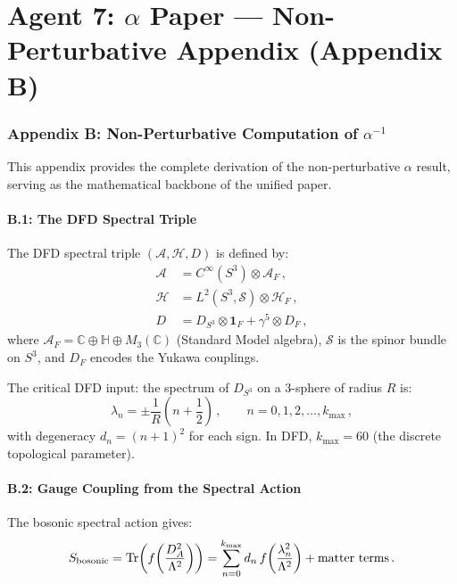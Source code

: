 \documentclass[11pt,a4paper]{article}
\newcommand{\Tr}{\operatorname{Tr}}
\begin{document}
\part{Agent 7: $\alpha$ Paper --- Non-Perturbative Appendix (Appendix B)}
\label{part:alpha-appendix}

\section{Appendix B: Non-Perturbative Computation of $\alpha^{-1}$}

This appendix provides the complete derivation of the non-perturbative $\alpha$ result, serving as the mathematical backbone of the unified paper.

\subsection{B.1: The DFD Spectral Triple}

The DFD spectral triple $(\mathcal{A}, \mathcal{H}, D)$ is defined by:
\begin{align}
\mathcal{A} &= C^\infty(S^3) \otimes \mathcal{A}_F\,, \\
\mathcal{H} &= L^2(S^3, \mathcal{S}) \otimes \mathcal{H}_F\,, \\
D &= D_{S^3} \otimes \mathbf{1}_F + \gamma^5 \otimes D_F\,,
\end{align}
where $\mathcal{A}_F = \mathbb{C} \oplus \mathbb{H} \oplus M_3(\mathbb{C})$ (Standard Model algebra), $\mathcal{S}$ is the spinor bundle on $S^3$, and $D_F$ encodes the Yukawa couplings.

The critical DFD input: the spectrum of $D_{S^3}$ on a 3-sphere of radius $R$ is:
\begin{equation}
\lambda_n = \pm\frac{1}{R}\left(n + \frac{1}{2}\right)\,, \qquad n = 0, 1, 2, \ldots, k_{\max}\,,
\end{equation}
with degeneracy $d_n = (n+1)^2$ for each sign. In DFD, $k_{\max} = 60$ (the discrete topological parameter).

\subsection{B.2: Gauge Coupling from the Spectral Action}

The bosonic spectral action gives:
\begin{equation}
S_{\rm bosonic} = \Tr\!\left(f\!\left(\frac{D_A^2}{\Lambda^2}\right)\right) = \sum_{n=0}^{k_{\max}} d_n\, f\!\left(\frac{\lambda_n^2}{\Lambda^2}\right) + \text{matter terms}\,.
\end{equation}
\end{document}
